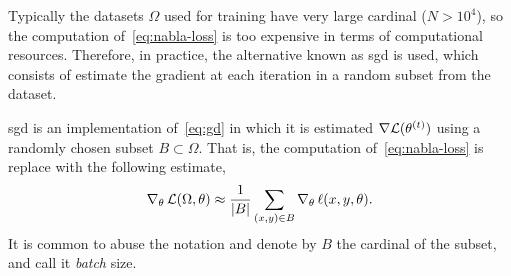 Typically the datasets \(\Omega\) used for training have very large cardinal
(\(N > 10^4\)), so the computation of\ \vref{eq:nabla-loss} is too expensive in
terms of computational resources. Therefore, in practice, the alternative known
as \gls{sgd} is used, which consists of estimate the gradient at each iteration
in a random subset from the dataset.

\gls{sgd} is an implementation of\ \vref{eq:gd} in which it is estimated
\(\nabla \mathcal{L} (\theta^{(t)})\) using a randomly chosen subset
\(B \subset \Omega\). That is, the computation of\ \vref{eq:nabla-loss} is
replace with the following estimate,
\begin{equation}\label{eq:nabla-loss-sto}
  \nabla_{\theta}\,\mathcal{L}(\Omega, \theta) \approx
  \frac{1}{\lvert B\rvert} \sum_{(x, y) \in B} \nabla_{\theta}\,\ell (x, y, \theta).
\end{equation}
It is common to abuse the notation and denote by \(B\) the cardinal of the
subset, and call it \emph{batch} size.

